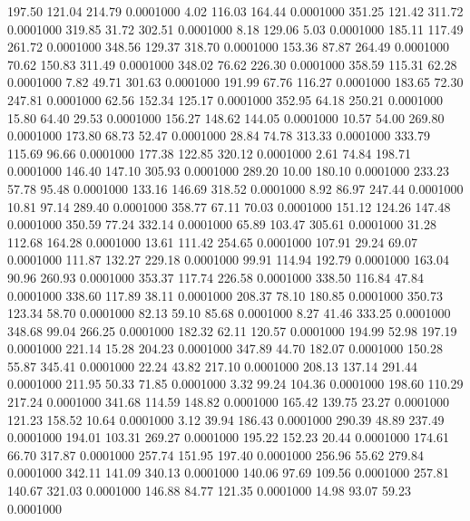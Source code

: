  197.50  121.04  214.79   0.0001000
   4.02  116.03  164.44   0.0001000
 351.25  121.42  311.72   0.0001000
 319.85   31.72  302.51   0.0001000
   8.18  129.06    5.03   0.0001000
 185.11  117.49  261.72   0.0001000
 348.56  129.37  318.70   0.0001000
 153.36   87.87  264.49   0.0001000
  70.62  150.83  311.49   0.0001000
 348.02   76.62  226.30   0.0001000
 358.59  115.31   62.28   0.0001000
   7.82   49.71  301.63   0.0001000
 191.99   67.76  116.27   0.0001000
 183.65   72.30  247.81   0.0001000
  62.56  152.34  125.17   0.0001000
 352.95   64.18  250.21   0.0001000
  15.80   64.40   29.53   0.0001000
 156.27  148.62  144.05   0.0001000
  10.57   54.00  269.80   0.0001000
 173.80   68.73   52.47   0.0001000
  28.84   74.78  313.33   0.0001000
 333.79  115.69   96.66   0.0001000
 177.38  122.85  320.12   0.0001000
   2.61   74.84  198.71   0.0001000
 146.40  147.10  305.93   0.0001000
 289.20   10.00  180.10   0.0001000
 233.23   57.78   95.48   0.0001000
 133.16  146.69  318.52   0.0001000
   8.92   86.97  247.44   0.0001000
  10.81   97.14  289.40   0.0001000
 358.77   67.11   70.03   0.0001000
 151.12  124.26  147.48   0.0001000
 350.59   77.24  332.14   0.0001000
  65.89  103.47  305.61   0.0001000
  31.28  112.68  164.28   0.0001000
  13.61  111.42  254.65   0.0001000
 107.91   29.24   69.07   0.0001000
 111.87  132.27  229.18   0.0001000
  99.91  114.94  192.79   0.0001000
 163.04   90.96  260.93   0.0001000
 353.37  117.74  226.58   0.0001000
 338.50  116.84   47.84   0.0001000
 338.60  117.89   38.11   0.0001000
 208.37   78.10  180.85   0.0001000
 350.73  123.34   58.70   0.0001000
  82.13   59.10   85.68   0.0001000
   8.27   41.46  333.25   0.0001000
 348.68   99.04  266.25   0.0001000
 182.32   62.11  120.57   0.0001000
 194.99   52.98  197.19   0.0001000
 221.14   15.28  204.23   0.0001000
 347.89   44.70  182.07   0.0001000
 150.28   55.87  345.41   0.0001000
  22.24   43.82  217.10   0.0001000
 208.13  137.14  291.44   0.0001000
 211.95   50.33   71.85   0.0001000
   3.32   99.24  104.36   0.0001000
 198.60  110.29  217.24   0.0001000
 341.68  114.59  148.82   0.0001000
 165.42  139.75   23.27   0.0001000
 121.23  158.52   10.64   0.0001000
   3.12   39.94  186.43   0.0001000
 290.39   48.89  237.49   0.0001000
 194.01  103.31  269.27   0.0001000
 195.22  152.23   20.44   0.0001000
 174.61   66.70  317.87   0.0001000
 257.74  151.95  197.40   0.0001000
 256.96   55.62  279.84   0.0001000
 342.11  141.09  340.13   0.0001000
 140.06   97.69  109.56   0.0001000
 257.81  140.67  321.03   0.0001000
 146.88   84.77  121.35   0.0001000
  14.98   93.07   59.23   0.0001000
